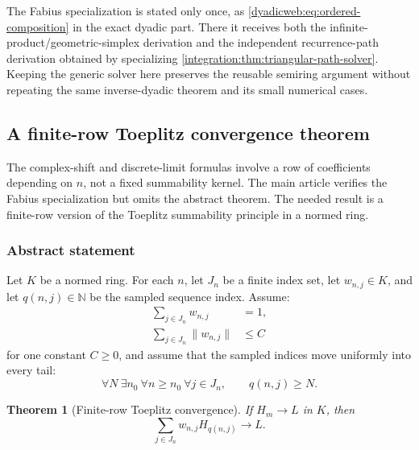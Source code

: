 \documentclass[11pt,oneside]{article}
\newtheorem{theorem}{Theorem}[section]
\theoremstyle{definition}
\theoremstyle{remark}
\newcommand{\N}{\mathbb N}
\begin{document}
The Fabius specialization is stated only once, as
\eqref{dyadicweb:eq:ordered-composition} in the exact dyadic part.  There it receives both
the infinite-product/geometric-simplex derivation and the independent recurrence-path
derivation obtained by specializing \cref{integration:thm:triangular-path-solver}.  Keeping
the generic solver here preserves the reusable semiring argument without repeating the
same inverse-dyadic theorem and its small numerical cases.

\subsection{A finite-row Toeplitz convergence theorem}
\label{integration:sec:toeplitz}

The complex-shift and discrete-limit formulas involve a row of coefficients depending on
$n$, not a fixed summability kernel.  The main article verifies the Fabius specialization but
omits the abstract theorem.  The needed result is a finite-row version of the Toeplitz
summability principle in a normed ring.

\subsubsection{Abstract statement}

Let $K$ be a normed ring.  For each $n$, let $J_n$ be a finite index set, let
$w_{n,j}\in K$, and let $q(n,j)\in\N$ be the sampled sequence index.  Assume:
\begin{align}
 \sum_{j\in J_n}w_{n,j}&=1,                                \label{integration:eq:toeplitz-row-mass}\\
 \sum_{j\in J_n}\|w_{n,j}\|&\le C                         \label{integration:eq:toeplitz-variation}
\end{align}
for one constant $C\ge0$, and assume that the sampled indices move uniformly into every
tail:
\begin{equation}
 \forall N\ \exists n_0\ \forall n\ge n_0\ \forall j\in J_n,
 \qquad q(n,j)\ge N.
 \label{integration:eq:toeplitz-tail-index}
\end{equation}

\begin{theorem}[Finite-row Toeplitz convergence]
\label{integration:thm:finite-row-toeplitz}
If $H_m\to L$ in $K$, then
\begin{equation}
 \sum_{j\in J_n}w_{n,j}H_{q(n,j)}\longrightarrow L.
 \label{integration:eq:finite-row-toeplitz}
\end{equation}
\end{theorem}
\end{document}
